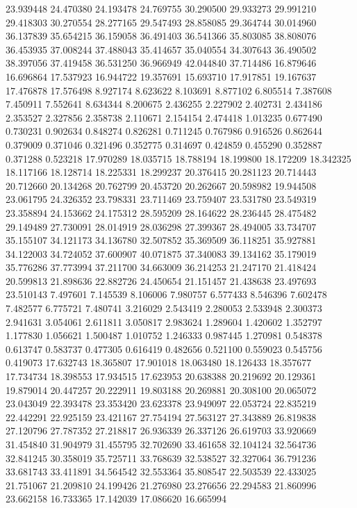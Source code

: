 23.939448
24.470380
24.193478
24.769755
30.290500
29.933273
29.991210
29.418303
30.270554
28.277165
29.547493
28.858085
29.364744
30.014960
36.137839
35.654215
36.159058
36.491403
36.541366
35.803085
38.808076
36.453935
37.008244
37.488043
35.414657
35.040554
34.307643
36.490502
38.397056
37.419458
36.531250
36.966949
42.044840
37.714486
16.879646
16.696864
17.537923
16.944722
19.357691
15.693710
17.917851
19.167637
17.476878
17.576498
8.927174
8.623622
8.103691
8.877102
6.805514
7.387608
7.450911
7.552641
8.634344
8.200675
2.436255
2.227902
2.402731
2.434186
2.353527
2.327856
2.358738
2.110671
2.154154
2.474418
1.013235
0.677490
0.730231
0.902634
0.848274
0.826281
0.711245
0.767986
0.916526
0.862644
0.379009
0.371046
0.321496
0.352775
0.314697
0.424859
0.455290
0.352887
0.371288
0.523218
17.970289
18.035715
18.788194
18.199800
18.172209
18.342325
18.117166
18.128714
18.225331
18.299237
20.376415
20.281123
20.714443
20.712660
20.134268
20.762799
20.453720
20.262667
20.598982
19.944508
23.061795
24.326352
23.798331
23.711469
23.759407
23.531780
23.549319
23.358894
24.153662
24.175312
28.595209
28.164622
28.236445
28.475482
29.149489
27.730091
28.014919
28.036298
27.399367
28.494005
33.734707
35.155107
34.121173
34.136780
32.507852
35.369509
36.118251
35.927881
34.122003
34.724052
37.600907
40.071875
37.340083
39.134162
35.179019
35.776286
37.773994
37.211700
34.663009
36.214253
21.247170
21.418424
20.599813
21.898636
22.882726
24.450654
21.151457
21.438638
23.497693
23.510143
7.497601
7.145539
8.106006
7.980757
6.577433
8.546396
7.602478
7.482577
6.775721
7.480741
3.216029
2.543419
2.280053
2.533948
2.300373
2.941631
3.054061
2.611811
3.050817
2.983624
1.289604
1.420602
1.352797
1.177830
1.056621
1.500487
1.010752
1.246333
0.987445
1.270981
0.548378
0.613747
0.583737
0.477305
0.616419
0.482656
0.521100
0.559023
0.545756
0.419073
17.632743
18.365807
17.901018
18.063480
18.126433
18.357677
17.734734
18.398553
17.934515
17.623953
20.638388
20.219692
20.129361
19.879014
20.447257
20.222911
19.803188
20.269881
20.308100
20.065072
23.043049
22.393478
23.353420
23.623378
23.949097
22.053724
22.835219
22.442291
22.925159
23.421167
27.754194
27.563127
27.343889
26.819838
27.120796
27.787352
27.218817
26.936339
26.337126
26.619703
33.920669
31.454840
31.904979
31.455795
32.702690
33.461658
32.104124
32.564736
32.841245
30.358019
35.725711
33.768639
32.538527
32.327064
36.791236
33.681743
33.411891
34.564542
32.553364
35.808547
22.503539
22.433025
21.751067
21.209810
24.199426
21.276980
23.276656
22.294583
21.860996
23.662158
16.733365
17.142039
17.086620
16.665994
